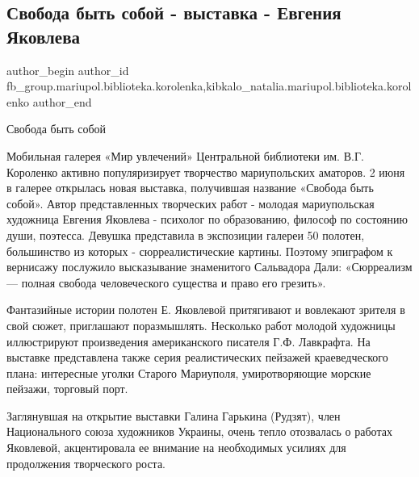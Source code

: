  
 
 
 
 

\subsection{Свобода быть собой - выставка - Евгения Яковлева}
\label{sec:03_06_2018.fb.fb_group.mariupol.biblioteka.korolenka.1.svoboda_bit_soboi___}
 
\ifcmt
 author_begin
   author_id fb_group.mariupol.biblioteka.korolenka,kibkalo_natalia.mariupol.biblioteka.korolenko
 author_end
\fi

Свобода быть собой

Мобильная галерея «Мир увлечений» Центральной библиотеки им. В.Г. Короленко
активно популяризирует творчество мариупольских аматоров. 2 июня в галерее
открылась новая выставка, получившая название «Свобода быть собой». Автор
представленных творческих  работ - молодая мариупольская  художница Евгения
Яковлева - психолог по образованию, философ по состоянию души, поэтесса.
Девушка  представила в экспозиции галереи 50 полотен, большинство из которых -
сюрреалистические картины. Поэтому эпиграфом к вернисажу послужило высказывание
знаменитого Сальвадора Дали: «Сюрреализм — полная свобода человеческого
существа и право его грезить». 

Фантазийные истории полотен Е. Яковлевой притягивают и вовлекают зрителя в свой
сюжет, приглашают поразмышлять. Несколько работ молодой художницы иллюстрируют
произведения американского писателя Г.Ф. Лавкрафта. На выставке представлена
также серия реалистических пейзажей краеведческого плана:  интересные уголки
Старого Мариуполя, умиротворяющие морские пейзажи, торговый порт. 

Заглянувшая на открытие выставки Галина Гарькина (Рудзят), член Национального
союза художников Украины, очень тепло отозвалась о работах Яковлевой,
акцентировала ее внимание на необходимых усилиях для продолжения творческого
роста.

